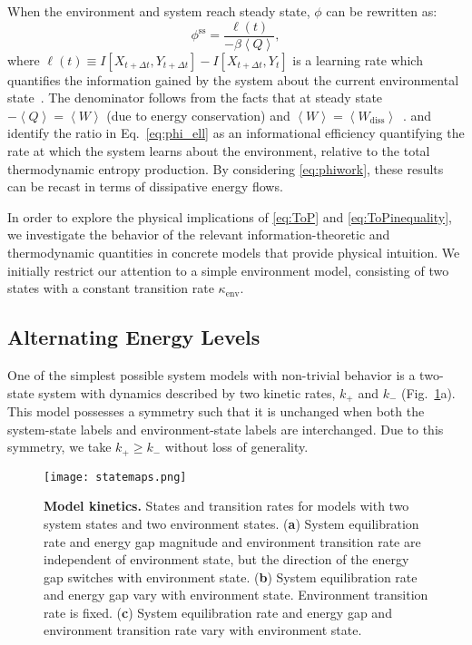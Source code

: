 \documentclass[entropy,article,
submit,
moreauthors,pdftex,10pt,a4paper]{mdpi}
\newcommand{\phiSS}{\phi^{\mathrm{ss}}}
\newcommand{\kenv}{\kappa_\mathrm{env}}
\begin{document}
When the environment and system reach steady state, $\phi$ can be rewritten as:
\begin{equation}
\label{eq:phi_ell}
\phiSS = \frac{\ell(t)}{-\beta \left\langle Q \right\rangle},
\end{equation}
where $\ell(t) \equiv I[X_{t+\Delta t},Y_{t+\Delta t}]-I[X_{t+\Delta t},Y_{t}]$ is a learning rate which quantifies the information gained by the system about the current environmental state~\cite{Brittain2017}. 
The denominator follows from the facts that at steady state $-\left\langle Q \right\rangle= \left\langle W \right\rangle$ (due to energy conservation) 
and
$\left\langle W \right\rangle=\left\langle W_\mathrm{diss} \right\rangle$~\cite{Still2012}.
\cite{Barato2014} and \cite{hartich2016sensory} identify the ratio in Eq.~\eqref{eq:phi_ell} as an informational efficiency quantifying the rate at which the system learns about the environment, relative to the total thermodynamic entropy production. 
By considering \eqref{eq:phiwork}, these results can be recast in terms of dissipative energy flows.

In order to explore the physical implications of \eqref{eq:ToP} and \eqref{eq:ToPinequality}, we investigate the behavior of the relevant information-theoretic and thermodynamic quantities in concrete models that provide physical intuition. We initially restrict our attention to a simple environment model, consisting of two states with a constant transition rate $\kenv$.


\subsection{Alternating Energy Levels}
\label{sec:antisym}
One of the simplest possible system models with non-trivial behavior is a two-state system with dynamics described by two kinetic rates, $k_{+}$ and $k_{-}$ (Fig.~\ref{fig:statemaps}a). 
This model possesses a symmetry such that it is unchanged when both the system-state labels and environment-state labels are interchanged. Due to this symmetry, we take $k_{+} \ge k_{-}$ without loss of generality. 

\begin{figure}[H]
\centering
\texttt{[image: statemaps.png]}
\caption{{\bf Model kinetics.} 
States and transition rates for models with two system states and two environment states. (\textbf{a}) System equilibration rate and energy gap magnitude and environment transition rate are independent of environment state, but the direction of the energy gap switches with environment state. (\textbf{b}) System equilibration rate and energy gap vary with environment state. Environment transition rate is fixed. (\textbf{c}) System equilibration rate and energy gap and environment transition rate vary with environment state. 
}
\label{fig:statemaps}
\end{figure}
\end{document}

